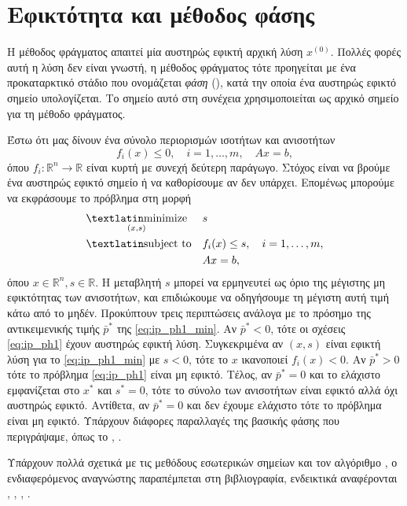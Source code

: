 \section{Εφικτότητα και μέθοδος  φάσης}
Η μέθοδος φράγματος απαιτεί μία αυστηρώς εφικτή αρχική λύση \( x^{(0)} \).
Πολλές φορές αυτή η λύση δεν είναι γνωστή, η μέθοδος φράγματος τότε προηγείται
με ένα προκαταρκτικό στάδιο που ονομάζεται \emph{φάση } (),
κατά την οποία ένα αυστηρώς εφικτό σημείο υπολογίζεται. Το σημείο αυτό στη
συνέχεια χρησιμοποιείται ως αρχικό σημείο για τη μέθοδο φράγματος.

Έστω ότι μας δίνουν ένα σύνολο περιορισμών ισοτήτων και ανισοτήτων
\begin{equation}\label{eq:ip_ph1}
    f_i(x) \leq 0, \quad i = 1, \dots,m, \quad Ax = b,
\end{equation}
όπου \( f_i : \mathbb{R}^n \to \mathbb{R} \) είναι κυρτή με συνεχή δεύτερη
παράγωγο. Στόχος είναι να βρούμε ένα αυστηρώς εφικτό σημείο ή να καθορίσουμε
αν δεν υπάρχει. Επομένως μπορούμε να εκφράσουμε το πρόβλημα στη μορφή
\begin{equation}\label{eq:ip_ph1_min}
    \begin{aligned}
        &\underset{(x,s)}{\text{\tl{minimize}}}
        & & s \\
        & \text{\tl{subject to}}
        & & f_i(x) \leq s, \quad i = 1,\dots,m, \\
        &&& Ax = b,
    \end{aligned}
\end{equation}
όπου \( x \in \mathbb{R}^n, s \in \mathbb{R} \). Η μεταβλητή \( s \) μπορεί να
ερμηνευτεί ως όριο της μέγιστης μη εφικτότητας των ανισοτήτων, και επιδιώκουμε
να οδηγήσουμε τη μέγιστη αυτή τιμή κάτω από το μηδέν. Προκύπτουν τρεις
περιπτώσεις ανάλογα με το πρόσημο της αντικειμενικής τιμής \( \bar{p}^*\) της
\eqref{eq:ip_ph1_min}. Αν \(\bar{p}^* < 0 \), τότε οι σχέσεις \eqref{eq:ip_ph1}
έχουν αυστηρώς εφικτή λύση. Συγκεκριμένα αν \((x,s)\) είναι εφικτή λύση για το
\eqref{eq:ip_ph1_min} με \(s<0\), τότε το \(x\) ικανοποιεί \(f_i(x)<0\). Αν
\(\bar{p}^*>0\) τότε το πρόβλημα \eqref{eq:ip_ph1} είναι μη εφικτό. Τέλος, αν
\(\bar{p}^*=0\) και το ελάχιστο εμφανίζεται στο \( x^*\) και \(s^*=0\), τότε το
σύνολο των ανισοτήτων είναι εφικτό αλλά όχι αυστηρώς εφικτό. Αντίθετα, αν
\(\bar{p}^*=0\) και δεν έχουμε ελάχιστο τότε το πρόβλημα είναι μη εφικτό.
Υπάρχουν διάφορες παραλλαγές της βασικής φάσης  που περιγράψαμε, όπως το
, .

Υπάρχουν πολλά σχετικά με τις μεθόδους εσωτερικών σημείων και τον αλγόριθμο
, ο ενδιαφερόμενος αναγνώστης παραπέμπεται στη βιβλιογραφία,
ενδεικτικά αναφέρονται \cite{renegar2001mathematical}, \cite{nesterov1994interior},
\cite{wright1997primal}, \cite{boyd2004convex}.
